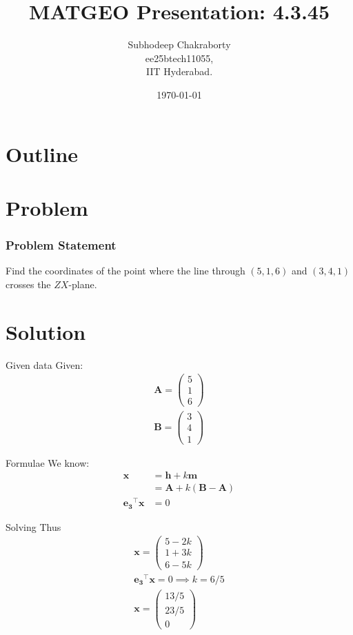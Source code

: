 \documentclass{beamer}
\title{MATGEO Presentation: 4.3.45}
\author{Subhodeep Chakraborty \\ ee25btech11055,\\IIT Hyderabad.}
\date{\today}
\providecommand{\brak}[1]{\ensuremath{\left(#1\right)}}
\theoremstyle{remark}
\newcommand{\myvec}[1]{\ensuremath{\begin{pmatrix}#1\end{pmatrix}}}
\let\vec\mathbf
\numberwithin{equation}{section}
\begin{document}
\begin{frame}
\titlepage
\end{frame}

\section*{Outline}
\begin{frame}
\tableofcontents
\end{frame}

\section{Problem}
\begin{frame}
\frametitle{Problem Statement}

Find the coordinates of the point where the line through \brak{5, 1, 6} and \brak{3, 4, 1} crosses the $ZX$-plane.

\end{frame}

\section{Solution}
\begin{frame}{Given data}
Given:
\begin{align}
 \vec{A} = \myvec{5\\1\\6} \\
 \vec{B} = \myvec{3\\4\\1}
\end{align}
\end{frame}

\begin{frame}{Formulae}
We know:
\begin{align}
 \vec{x} &= \vec{h} +k\vec{m} \\
 &= \vec{A} + k\brak{\vec{B-A}} \\
 \vec{e_3}^\top\vec{x} &= 0
\end{align}
\end{frame}

\begin{frame}{Solving}
Thus
\begin{align}
 \vec{x} = \myvec{5-2k \\ 1+3k \\ 6-5k} \\
  \vec{e_3}^\top\vec{x} = 0 \implies k = 6/5 \\
  \vec{x} = \myvec{13/5 \\ 23/5 \\ 0}
\end{align}
\end{frame}
\end{document}
